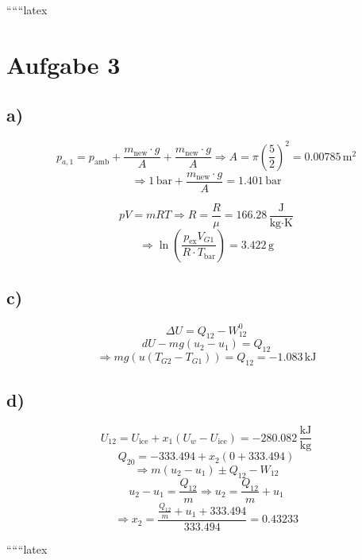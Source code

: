 
``````latex


\section*{Aufgabe 3}

\subsection*{a)}
\[
p_{a,1} = p_{\text{amb}} + \frac{m_{\text{new}} \cdot g}{A} + \frac{m_{\text{new}} \cdot g}{A} \Rightarrow A = \pi \left( \frac{5}{2} \right)^2 = 0.00785 \, \text{m}^2
\]
\[
\Rightarrow 1 \, \text{bar} + \frac{m_{\text{new}} \cdot g}{A} = 1.401 \, \text{bar}
\]

\[
pV = mRT \Rightarrow R = \frac{R}{\mu} = 166.28 \, \frac{\text{J}}{\text{kg} \cdot \text{K}}
\]
\[
\Rightarrow \ln \left( \frac{p_{\text{ex}} V_{G1}}{R \cdot T_{\text{bar}}} \right) = 3.422 \, \text{g}
\]

\subsection*{c)}
\[
\Delta U = Q_{12} - W_{12}^0
\]
\[
dU - m g (u_2 - u_1) = Q_{12}
\]
\[
\Rightarrow m g (u \left( T_{G2} - T_{G1} \right)) = Q_{12} = -1.083 \, \text{kJ}
\]

\subsection*{d)}
\[
U_{12} = U_{\text{ice}} + x_1 \left( U_{w} - U_{\text{ice}} \right) = -280.082 \, \frac{\text{kJ}}{\text{kg}}
\]
\[
Q_{20} = -333.494 + x_2 \left( 0 + 333.494 \right)
\]
\[
\Rightarrow m (u_2 - u_1) \pm Q_{12} - W_{12}
\]
\[
u_2 - u_1 = \frac{Q_{12}}{m} \Rightarrow u_2 = \frac{Q_{12}}{m} + u_1
\]
\[
\Rightarrow x_2 = \frac{\frac{Q_{12}}{m} + u_1 + 333.494}{333.494} = 0.43233
\]

``````latex


